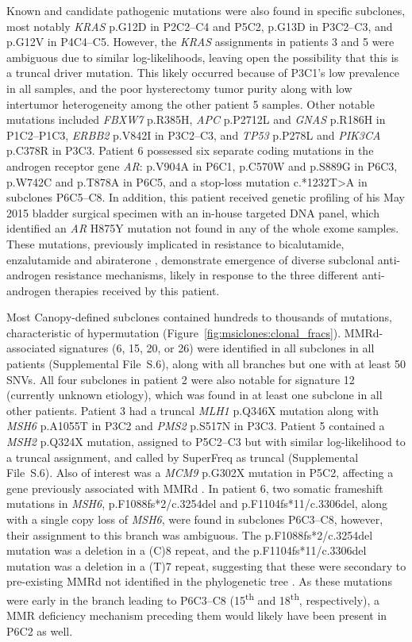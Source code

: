 Known and candidate pathogenic mutations were also found in specific subclones, most notably \textit{KRAS} p.G12D in P2C2--C4 and P5C2, p.G13D in P3C2--C3, and p.G12V in P4C4--C5. However, the \textit{KRAS} assignments in patients 3 and 5 were ambiguous due to similar log-likelihoods, leaving open the possibility that this is a truncal driver mutation. This likely occurred because of P3C1's low prevalence in all samples, and the poor hysterectomy tumor purity along with low intertumor heterogeneity among the other patient 5 samples. Other notable mutations included \textit{FBXW7} p.R385H, \textit{APC} p.P2712L and \textit{GNAS} p.R186H in P1C2--P1C3, \textit{ERBB2} p.V842I in P3C2--C3, and \textit{TP53} p.P278L and \textit{PIK3CA} p.C378R in P3C3. Patient 6 possessed six separate coding mutations in the androgen receptor gene \textit{AR}: p.V904A in P6C1, p.C570W and p.S889G in P6C3, p.W742C and p.T878A in P6C5, and a stop-loss mutation c.*1232T\textgreater{}A in subclones P6C5--C8. In addition, this patient received genetic profiling of his May 2015 bladder surgical specimen with an in-house targeted DNA panel, which identified an \textit{AR} H875Y mutation not found in any of the whole exome samples. These mutations, previously implicated in resistance to bicalutamide, enzalutamide and abiraterone \cite{hara2003,chen2015,lallous2016}, demonstrate emergence of diverse subclonal anti-androgen resistance mechanisms, likely in response to the three different anti-androgen therapies received by this patient.

Most Canopy-defined subclones contained hundreds to thousands of mutations, characteristic of hypermutation (Figure~\ref{fig:msiclones:clonal_fracs}). MMRd-associated signatures (6, 15, 20, or 26) were identified in all subclones in all patients (Supplemental File~S\thechapter{}.6), along with all branches but one with at least 50 SNVs. All four subclones in patient 2 were also notable for signature 12 (currently unknown etiology), which was found in at least one subclone in all other patients. Patient 3 had a truncal \textit{MLH1} p.Q346X mutation along with \textit{MSH6} p.A1055T in P3C2 and \textit{PMS2} p.S517N in P3C3. Patient 5 contained a \textit{MSH2} p.Q324X mutation, assigned to P5C2--C3 but with similar log-likelihood to a truncal assignment, and called by SuperFreq as truncal (Supplemental File~S\thechapter{}.6). Also of interest was a \textit{MCM9} p.G302X mutation in P5C2, affecting a gene previously associated with MMRd \cite{traver2015}. In patient 6, two somatic frameshift mutations in \textit{MSH6}, p.F1088fs*2/c.3254del and p.F1104fs*11/c.3306del, along with a single copy loss of \textit{MSH6}, were found in subclones P6C3--C8, however, their assignment to this branch was ambiguous. The p.F1088fs*2/c.3254del mutation was a deletion in a (C)8 repeat, and the p.F1104fs*11/c.3306del mutation was a deletion in a (T)7 repeat, suggesting that these were secondary to pre-existing MMRd not identified in the phylogenetic tree \cite{shia2012}. As these mutations were early in the branch leading to P6C3--C8 (15\textsuperscript{th} and 18\textsuperscript{th}, respectively), a MMR deficiency mechanism preceding them would likely have been present in P6C2 as well.

